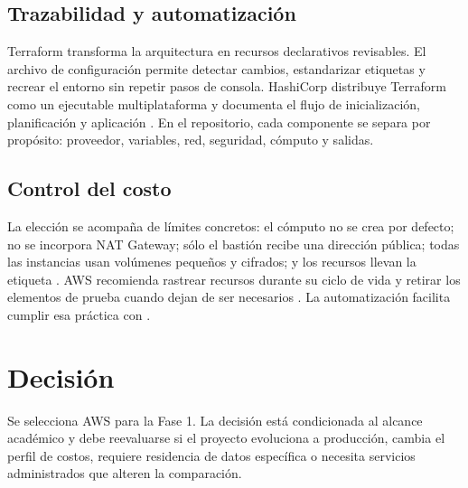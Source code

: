 \subsection{Trazabilidad y automatización}

Terraform transforma la arquitectura en recursos declarativos revisables. El archivo de configuración permite detectar cambios, estandarizar etiquetas y recrear el entorno sin repetir pasos de consola. HashiCorp distribuye Terraform como un ejecutable multiplataforma y documenta el flujo de inicialización, planificación y aplicación \cite{terraform-install}. En el repositorio, cada componente se separa por propósito: proveedor, variables, red, seguridad, cómputo y salidas.

\subsection{Control del costo}

La elección se acompaña de límites concretos: el cómputo no se crea por defecto; no se incorpora NAT Gateway; sólo el bastión recibe una dirección pública; todas las instancias usan volúmenes pequeños y cifrados; y los recursos llevan la etiqueta . AWS recomienda rastrear recursos durante su ciclo de vida y retirar los elementos de prueba cuando dejan de ser necesarios \cite{aws-track-resources}. La automatización facilita cumplir esa práctica con .

\section{Decisión}

Se selecciona AWS para la Fase 1. La decisión está condicionada al alcance académico y debe reevaluarse si el proyecto evoluciona a producción, cambia el perfil de costos, requiere residencia de datos específica o necesita servicios administrados que alteren la comparación.
